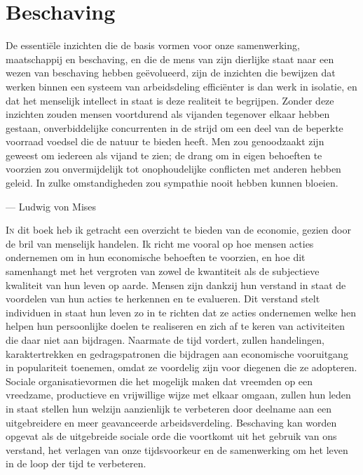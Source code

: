 \hypertarget{beschaving}{%
\chapter{Beschaving}\label{beschaving}}

\vspace{-1em}
\begin{blockquotebox}
    De essentiële inzichten die de basis vormen voor onze samenwerking, maatschappij en beschaving, en die de mens van zijn dierlijke staat naar een wezen van beschaving hebben geëvolueerd, zijn de inzichten die bewijzen dat werken binnen een systeem van arbeidsdeling efficiënter is dan werk in isolatie, en dat het menselijk intellect in staat is deze realiteit te begrijpen. Zonder deze inzichten zouden mensen voortdurend als vijanden tegenover elkaar hebben gestaan, onverbiddelijke concurrenten in de strijd om een deel van de beperkte voorraad voedsel die de natuur te bieden heeft. Men zou genoodzaakt zijn geweest om iedereen als vijand te zien; de drang om in eigen behoeften te voorzien zou onvermijdelijk tot onophoudelijke conflicten met anderen hebben geleid. In zulke omstandigheden zou sympathie nooit hebben kunnen bloeien.\footnotemark
    \par\raggedleft--- Ludwig von Mises
\end{blockquotebox}

\lettrine{I}n dit boek heb ik getracht een overzicht te bieden van de economie, gezien door de bril van menselijk handelen. Ik richt me vooral op hoe mensen acties ondernemen om in hun economische behoeften te voorzien, en hoe dit samenhangt met het vergroten van zowel de kwantiteit als de subjectieve kwaliteit van hun leven op aarde. Mensen zijn dankzij hun verstand in staat de voordelen van hun acties te herkennen en te evalueren. Dit verstand stelt individuen in staat hun leven zo in te richten dat ze acties ondernemen welke hen helpen hun persoonlijke doelen te realiseren en zich af te keren van activiteiten die daar niet aan bijdragen. Naarmate de tijd vordert, zullen handelingen, karaktertrekken en gedragspatronen die bijdragen aan economische vooruitgang in populariteit toenemen, omdat ze voordelig zijn voor diegenen die ze adopteren. Sociale organisatievormen die het mogelijk maken dat vreemden op een vreedzame, productieve en vrijwillige wijze met elkaar omgaan, zullen hun leden in staat stellen hun welzijn aanzienlijk te verbeteren door deelname aan een uitgebreidere en meer geavanceerde arbeidsverdeling. Beschaving kan worden opgevat als de uitgebreide sociale orde die voortkomt uit het gebruik van ons verstand, het verlagen van onze tijdsvoorkeur en de samenwerking om het leven in de loop der tijd te verbeteren.

